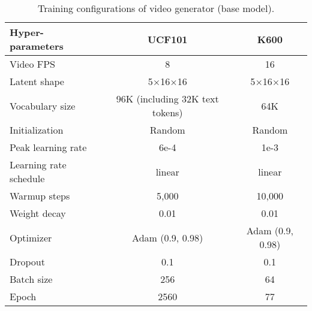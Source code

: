 \begin{table}[]
\caption{Training configurations of video generator (base model).}
\label{tab:gen_train_config}
\centering
\begin{tabular}{l|cc}
\toprule
Hyper-parameters                  & UCF101                          & K600                            \\ \midrule
Video  FPS              &  8  &  16 \\
Latent shape                      & 5$\times$16$\times$16           & 5$\times$16$\times$16           \\
Vocabulary size                   & 96K (including 32K text tokens)                          & 64K                           \\
Initialization                    & Random                          & Random                          \\
Peak learning rate                & 6e-4                            & 1e-3                            \\
Learning rate schedule            & linear & linear              \\
Warmup steps                      & 5,000                             & 10,000                             \\
Weight decay & 0.01 & 0.01 \\
Optimizer                         & Adam (0.9, 0.98)                           & Adam (0.9, 0.98)                           \\
Dropout & 0.1 & 0.1 \\
Batch size                        & 256                             & 64                             \\
Epoch                             & 2560                            & 77                             \\ \bottomrule
\end{tabular}
\end{table}